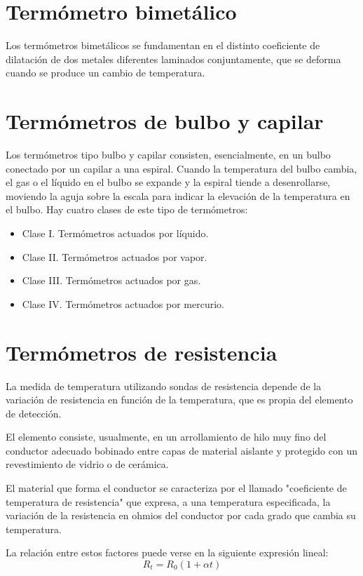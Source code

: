 \section{Termómetro bimetálico}
Los termómetros bimetálicos se fundamentan en el distinto coeficiente de dilatación de dos metales diferentes laminados conjuntamente, que se deforma cuando se produce un cambio de temperatura.

\section{Termómetros de bulbo y capilar}
Los termómetros tipo bulbo y capilar consisten, esencialmente, en un bulbo conectado por un capilar a una espiral. Cuando la temperatura del bulbo cambia, el gas o el líquido en el bulbo se expande y la espiral tiende a desenrollarse, moviendo la aguja sobre la escala para indicar la elevación de la temperatura en el bulbo.
Hay cuatro clases de este tipo de termómetros:
\begin{itemize}
    \item Clase I. Termómetros actuados por líquido.
    \item Clase II. Termómetros actuados por vapor.
    \item Clase III. Termómetros actuados por gas.
    \item Clase IV. Termómetros actuados por mercurio.
\end{itemize}

\section{Termómetros de resistencia}
La medida de temperatura utilizando sondas de resistencia depende de la variación de resistencia en función de la temperatura, que es propia del elemento de detección. 

El elemento consiste, usualmente, en un arrollamiento de hilo muy fino del conductor adecuado bobinado entre capas de material aislante y protegido con un revestimiento de vidrio o de cerámica.

El material que forma el conductor se caracteriza por el llamado "coeficiente de temperatura de resistencia" que expresa, a una temperatura especificada, la variación de la resistencia en ohmios del conductor por cada grado que cambia su temperatura.

La relación entre estos factores puede verse en la siguiente expresión lineal:
\begin{equation}
    R_t = R_0 (1 + \alpha t)
\end{equation}

